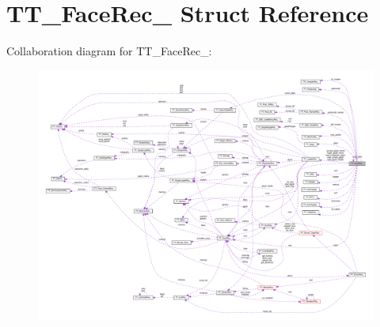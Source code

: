 \hypertarget{structTT__FaceRec__}{}\section{T\+T\+\_\+\+Face\+Rec\+\_\+ Struct Reference}
\label{structTT__FaceRec__}


Collaboration diagram for T\+T\+\_\+\+Face\+Rec\+\_\+\+:
\nopagebreak
\begin{figure}[H]
\begin{center}
\leavevmode
\includegraphics[width=350pt]{structTT__FaceRec____coll__graph}
\end{center}
\end{figure}
